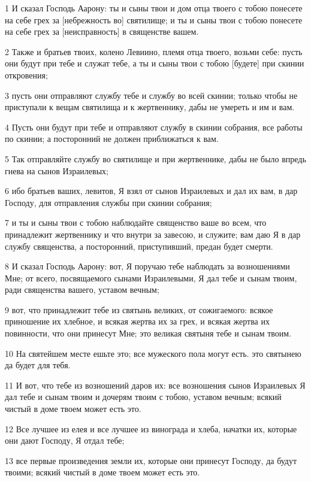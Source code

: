 \par 1 И сказал Господь Аарону: ты и сыны твои и дом отца твоего с тобою понесете на себе грех за [небрежность во] святилище; и ты и сыны твои с тобою понесете на себе грех за [неисправность] в священстве вашем.
\par 2 Также и братьев твоих, колено Левиино, племя отца твоего, возьми себе: пусть они будут при тебе и служат тебе, а ты и сыны твои с тобою [будете] при скинии откровения;
\par 3 пусть они отправляют службу тебе и службу во всей скинии; только чтобы не приступали к вещам святилища и к жертвеннику, дабы не умереть и им и вам.
\par 4 Пусть они будут при тебе и отправляют службу в скинии собрания, все работы по скинии; а посторонний не должен приближаться к вам.
\par 5 Так отправляйте службу во святилище и при жертвеннике, дабы не было впредь гнева на сынов Израилевых;
\par 6 ибо братьев ваших, левитов, Я взял от сынов Израилевых и дал их вам, в дар Господу, для отправления службы при скинии собрания;
\par 7 и ты и сыны твои с тобою наблюдайте священство ваше во всем, что принадлежит жертвеннику и что внутри за завесою, и служите; вам даю Я в дар службу священства, а посторонний, приступивший, предан будет смерти.
\par 8 И сказал Господь Аарону: вот, Я поручаю тебе наблюдать за возношениями Мне; от всего, посвящаемого сынами Израилевыми, Я дал тебе и сынам твоим, ради священства вашего, уставом вечным;
\par 9 вот, что принадлежит тебе из святынь великих, от сожигаемого: всякое приношение их хлебное, и всякая жертва их за грех, и всякая жертва их повинности, что они принесут Мне; это великая святыня тебе и сынам твоим.
\par 10 На святейшем месте ешьте это; все мужеского пола могут есть. это святынею да будет для тебя.
\par 11 И вот, что тебе из возношений даров их: все возношения сынов Израилевых Я дал тебе и сынам твоим и дочерям твоим с тобою, уставом вечным; всякий чистый в доме твоем может есть это.
\par 12 Все лучшее из елея и все лучшее из винограда и хлеба, начатки их, которые они дают Господу, Я отдал тебе;
\par 13 все первые произведения земли их, которые они принесут Господу, да будут твоими; всякий чистый в доме твоем может есть это.
